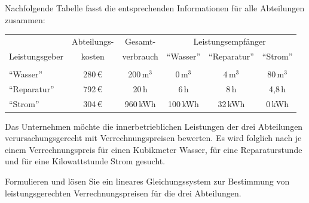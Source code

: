 \documentclass[fontsize=11pt, parskip=half]{scrartcl}
\begin{document}
Nachfolgende Tabelle fasst die entsprechenden Informationen für alle
Abteilungen zusammen:\vspace{-0.5cm}

\begin{center}
\begin{tabular}{|l|c|c|ccc|}   \hline
                                     &      Abteilungs-         &   Gesamt-         & \multicolumn{3}{c|}{Leistungsempfänger}                    \\
 Leistungsgeber                      &      kosten  &               verbrauch       &   "`Wasser"'     &"`Reparatur"'  &"`Strom"'     \\[0.1cm] \hline
 &&&&&\\[-0.4cm]
  "`Wasser"'                         &      280\,€        &   200\,m$^3$      &       0\,m$^3$           & 4\,m$^3$         & 80\,m$^3$          \\
  "`Reparatur"'                      &      792\,€        &   20\,h           &       6\,h               & 8\,h             & 4,8\,h          \\
  "`Strom"'                          &      304\,€        &   960\,kWh        &       100\,kWh           & 32\,kWh          & 0\,kWh           \\    \hline
\end{tabular}
\end{center}

Das Unternehmen möchte die innerbetrieblichen Leistungen der drei
Abteilungen verursachungsgerecht mit Verrechnungspreisen bewerten.
Es wird folglich nach je einem Verrechnungspreis für einen
Kubikmeter Wasser, für eine Reparaturstunde und für eine
Kilowattstunde Strom gesucht.

Formulieren und lösen Sie ein lineares Gleichungssystem zur
Bestimmung von leistungsgerechten Verrechnungspreisen für die drei
Abteilungen.
\end{document}
